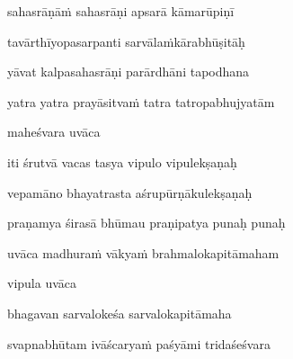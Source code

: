 sahasrāṇāṁ sahasrāṇi apsarā kāmarūpiṇī \veg\dontdisplaylinenum
{}

tavārthīyopasarpanti sarvālaṁkārabhūṣitāḥ\thinspace{\dandab} \dontdisplaylinenum
{}

yāvat kalpasahasrāṇi parārdhāni tapodhana \danda\dontdisplaylinenum
{}

yatra yatra prayāsitvaṁ tatra tatropabhujyatām \veg\dontdisplaylinenum
{}

maheśvara uvāca~{\dandab}\dontdisplaylinenum 

iti śrutvā vacas tasya vipulo vipulekṣaṇaḥ\thinspace{\danda} \dontdisplaylinenum
{}

vepamāno bhayatrasta aśrupūrṇākulekṣaṇaḥ \veg\dontdisplaylinenum
{}

praṇamya śirasā bhūmau praṇipatya punaḥ punaḥ\thinspace{\dandab} \dontdisplaylinenum
{}

uvāca madhuraṁ vākyaṁ brahmalokapitāmaham \veg\dontdisplaylinenum
{}

vipula uvāca~{\dandab}\dontdisplaylinenum 

bhagavan sarvalokeśa sarvalokapitāmaha\thinspace{\danda} \dontdisplaylinenum

svapnabhūtam ivāścaryaṁ paśyāmi tridaśeśvara \danda\dontdisplaylinenum
{}

